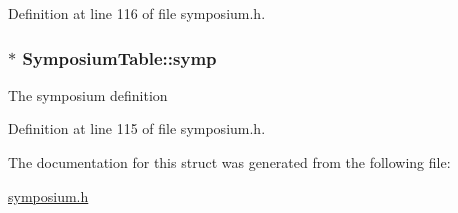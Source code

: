 Definition at line 116 of file symposium.\-h.

\hypertarget{structSymposiumTable_a4089e2778ba23eb79c4785eb5702f70f}{
\subsubsection[{symp}]{$\ast$ Symposium\-Table\-::symp}}\label{structSymposiumTable_a4089e2778ba23eb79c4785eb5702f70f}
The symposium definition 

Definition at line 115 of file symposium.\-h.



The documentation for this struct was generated from the following file\-:\begin{DoxyCompactItemize}
\item 
\hyperlink{symposium_8h}{symposium.\-h}\end{DoxyCompactItemize}

